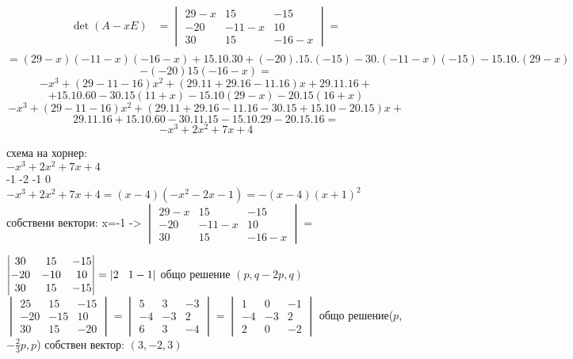 \documentclass{article}
\begin{document}
\begin{align*}
\det (A-xE)&=
\begin{vmatrix}
	29-x & 15 & -15  \\ 
	-20 & -11-x & 10 \\ 
	30 & 15 & -16-x  
	\end{vmatrix}= \\
\end{align*}
$$=(29-x)(-11-x)(-16-x) +15.10.30 +(-20).15.(-15) - 30.(-11-x)(-15)-15.10.(29-x) $$ $$ -(-20)15(-16-x)= $$ $$ -x^3 + (29-11-16)x^2 + (29.11+29.16-11.16)x + 29.11.16  + $$
$$ + 15.10.60 - 30.15(11+x) - 15.10(29-x ) -20.15(16+x)  $$
$$ -x^3 + (29-11-16)x^2 + (29.11 + 29.16 -11.16 -30.15 +15.10 -20.15)x +$$ $$ 29.11.16 +15.10.60 - 30.11.15 - 15.10.29 - 20.15.16 =  $$
$$-x^3 +2x^2 + 7x + 4  $$

схема на хорнер:\\
$-x^3 +2x^2 + 7x + 4  $ \\
-1 -2 -1 0 \\
$-x^3 +2x^2 + 7x + 4 = (x-4)(-x^2 -2x -1 ) = -(x-4)(x+1)^2  $\\
собствени вектори: x=-1 ->
$ \begin{vmatrix}
29-x & 15 & -15  \\ 
-20 & -11-x & 10 \\ 
30 & 15 & -16-x  
\end{vmatrix}=   $

$ \begin{vmatrix}
30 & 15 & -15  \\ 
-20 & -10 & 10 \\ 
30 & 15 & -15  
\end{vmatrix}= \left| 2 \hspace{0.3cm} 1 -1 \right|  $
общо решение $(p, q-2p ,q) $ \\
$ \begin{vmatrix}
25 & 15 & -15  \\ 
-20 & -15 & 10 \\ 
30 & 15 & -20  
\end{vmatrix}= \begin{vmatrix}
5 & 3 & -3  \\ 
-4 & -3 & 2 \\ 
6 & 3 & -4  
\end{vmatrix}=
\begin{vmatrix}
	1 & 0 & -1  \\ 
	-4 & -3 & 2 \\ 
	2 & 0 & -2  
\end{vmatrix}
  $
общо решение($p$, $-\frac{2}{3}p, p$)
собствен вектор: $(3,-2,3) $
\end{document}
